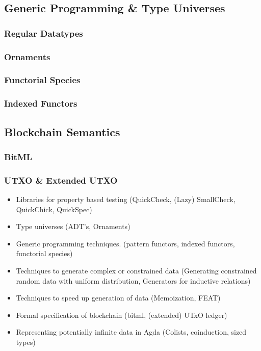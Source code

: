 \documentclass[11pt]{article}
\begin{document}
\subsection{Generic Programming \& Type Universes}

\subsubsection{Regular Datatypes}

\subsubsection{Ornaments}

\subsubsection{Functorial Species}

\subsubsection{Indexed Functors}

\subsection{Blockchain Semantics}

\subsubsection{BitML}

\subsubsection{UTXO \& Extended UTXO}

\begin{itemize}

\item
Libraries for property based testing (QuickCheck, (Lazy) SmallCheck, QuickChick, QuickSpec)

\item 
Type universes (ADT's, Ornaments) \cite{ko2016programming, dagand2017essence}

\item 
Generic programming techniques. (pattern functors, indexed functors, functorial species)

\item 
Techniques to generate complex or constrained data (Generating constrained random data with uniform distribution, Generators for inductive relations)

\item 
Techniques to speed up generation of data (Memoization, FEAT)

\item 
Formal specification of blockchain (bitml, (extended) UTxO ledger) \cite{zahnentferner2018chimeric, zahnentferner2018abstract}

\item 
Representing potentially infinite data in Agda (Colists, coinduction, sized types)

\end{itemize}
\end{document}
